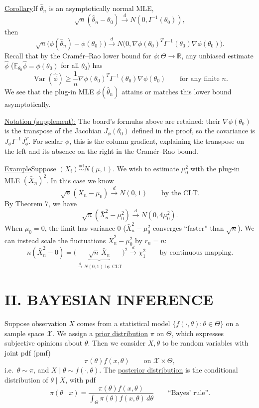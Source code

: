 \documentclass[11pt,a4paper]{article}
\begin{document}
\medskip
\noindent\underline{Corollary}\quad If $\hat\theta_n$ is an asymptotically normal MLE,
\[
\sqrt n(\hat\theta_n-\theta_0)\xrightarrow{d}
N(0,I^{-1}(\theta_0)),
\]
then
\[
\sqrt n\bigl(\phi(\hat\theta_n)-\phi(\theta_0)\bigr)
\xrightarrow{d}N\bigl(0,
\nabla\phi(\theta_0)^T I^{-1}(\theta_0)\nabla\phi(\theta_0)\bigr).
\]
Recall that by the Cram\'er--Rao lower bound for $\phi:\Theta\to\mathbb R$,
any unbiased estimate $\hat\phi$
($\mathbb E_{\theta_0}\hat\phi=\phi(\theta_0)$ for all $\theta_0$) has
\[
\operatorname{Var}(\hat\phi)\geq\frac1n
\nabla\phi(\theta_0)^T I^{-1}(\theta_0)\nabla\phi(\theta_0)
\qquad\text{for any finite }n.
\]
We see that the plug-in MLE $\phi(\hat\theta_n)$ attains or matches this
lower bound asymptotically.

\medskip
\noindent\underline{Notation (supplement):}\quad
The board's formulas above are retained: their $\nabla\phi(\theta_0)$
is the transpose of the Jacobian $J_\phi(\theta_0)$ defined in the proof,
so the covariance is $J_\phi I^{-1}J_\phi^T$.
For scalar $\phi$, this is the column gradient, explaining the transpose
on the left and its absence on the right in the Cram\'er--Rao bound.

\medskip
\noindent\underline{Example}\quad Suppose $(X_i)\overset{\mathrm{iid}}{\sim}N(\mu,1)$.
We wish to estimate $\mu_0^2$ with the plug-in MLE $(\bar X_n)^2$.
In this case we know
\[
\sqrt n(\bar X_n-\mu_0)\xrightarrow{d}N(0,1)
\qquad\text{by the CLT}.
\]
By Theorem 7, we have
\[
\sqrt n(\bar X_n^2-\mu_0^2)\xrightarrow{d}N(0,4\mu_0^2).
\]
When $\mu_0=0$, the limit has variance $0$
($\bar X_n^2-\mu_0^2$ converges ``faster'' than $\sqrt n$).
We can instead scale the fluctuations $\bar X_n^2-\mu_0^2$ by $r_n=n$:
\[
n(\bar X_n^2-0)
=\bigl(\underbrace{\sqrt n\,\bar X_n}_{\xrightarrow{d}N(0,1)\text{ by CLT}}\bigr)^2
\xrightarrow{d}\chi_1^2
\qquad\text{by continuous mapping}.
\]

\section*{II. BAYESIAN INFERENCE}

Suppose observation $X$ comes from a statistical model
$\{f(\cdot,\theta):\theta\in\Theta\}$ on a sample space $\mathcal X$.
We assign a \underline{prior distribution} $\pi$ on $\Theta$, which expresses
subjective opinions about $\theta$.
Then we consider $X,\theta$ to be random variables with joint pdf (pmf)
\[
\pi(\theta)f(x,\theta)\qquad\text{on }\mathcal X\times\Theta,
\]
i.e.\ $\theta\sim\pi$, and $X\mid\theta\sim f(\cdot,\theta)$.
The \underline{posterior distribution} is the conditional distribution of
$\theta\mid X$, with pdf
\[
\pi(\theta\mid x)=
\frac{\pi(\theta)f(x,\theta)}
{\displaystyle\int_\Theta\pi(\theta)f(x,\theta)\,d\theta}
\qquad\text{``Bayes' rule''}.
\]
\end{document}
